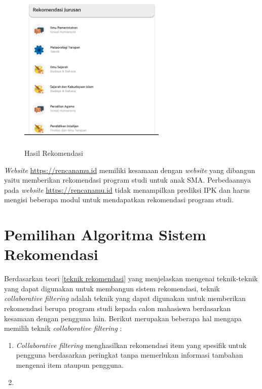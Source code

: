 \begin{enumerate}
    \begin{figure}[H]
        \centering
        \includegraphics[width = 7cm, height = 8cm ]{doc/DokumenSkripsi/Gambar/gambar36.PNG}
        \caption{Hasil Rekomendasi}
        \label{gambar36}
    \end{figure}
    
\end{enumerate}

\textit{Website} \url{https://rencanamu.id} memiliki kesamaan dengan \textit{website} yang dibangun yaitu memberikan rekomendasi program studi untuk anak SMA. Perbedaannya pada \textit{website} \url{https://rencanamu.id} tidak menampilkan prediksi IPK dan harus mengisi beberapa modul untuk mendapatkan rekomendasi program studi. 

\section{Pemilihan Algoritma Sistem Rekomendasi}
Berdasarkan teori \ref{teknik rekomendasi} yang menjelaskan mengenai teknik-teknik yang dapat digunakan untuk membangun sistem rekomendasi, teknik \textit{collaborative filtering} adalah teknik yang dapat digunakan untuk memberikan rekomendasi berupa program studi kepada calon mahasiswa berdasarkan kesamaan dengan pengguna lain. Berikut merupakan beberapa hal mengapa memilih teknik \textit{collaborative filtering} :

\begin{enumerate}
    \item \textit{Collaborative filtering} menghasilkan rekomendasi item yang spesifik untuk pengguna berdasarkan peringkat tanpa memerlukan informasi tambahan mengenai item ataupun pengguna.
    
    \item 
\end{enumerate}

